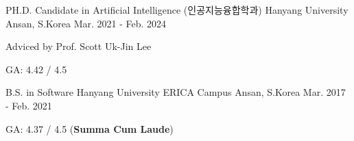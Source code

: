 

\begin{cventries}

  \cventry
    {PH.D. Candidate in Artificial Intelligence (인공지능융합학과)} %
    {Hanyang University} %
    {Ansan, S.Korea} %
    {Mar. 2021 - Feb. 2024} %
    {
      \begin{cvitems} %
        \item {Adviced by Prof. Scott Uk-Jin Lee}
        \item {GA: 4.42 / 4.5}
      \end{cvitems}
    }

    \cventry
    {B.S. in Software} %
    {Hanyang University ERICA Campus} %
    {Ansan, S.Korea} %
    {Mar. 2017 - Feb. 2021} %
    {
      \begin{cvitems} %
        \item {GA: 4.37 / 4.5 (\textbf{Summa Cum Laude})} 
      \end{cvitems}
    }

\end{cventries}
